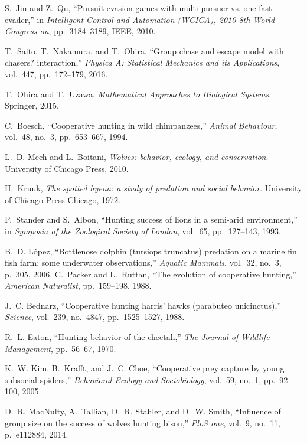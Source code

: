 \documentclass[12pt,a4paper,final]{iopart}
\begin{document}
\begin{thebibliography}{10}
S.~Jin and Z.~Qu, ``Pursuit-evasion games with multi-pursuer vs. one fast
evader,'' in {\em Intelligent Control and Automation (WCICA), 2010 8th World
Congress on}, pp.~3184--3189, IEEE, 2010.

T.~Saito, T.~Nakamura, and T.~Ohira, ``Group chase and escape model with
chasers? interaction,'' {\em Physica A: Statistical Mechanics and its
Applications}, vol.~447, pp.~172--179, 2016.

T.~Ohira and T.~Uzawa, {\em Mathematical Approaches to Biological Systems}.
\newblock Springer, 2015.


C.~Boesch, ``Cooperative hunting in wild chimpanzees,'' {\em Animal Behaviour},
vol.~48, no.~3, pp.~653--667, 1994.

L.~D. Mech and L.~Boitani, {\em Wolves: behavior, ecology, and conservation}.
\newblock University of Chicago Press, 2010.

H.~Kruuk, {\em The spotted hyena: a study of predation and social behavior}.
\newblock University of Chicago Press Chicago, 1972.

P.~Stander and S.~Albon, ``Hunting success of lions in a semi-arid
environment,'' in {\em Symposia of the Zoological Society of London},
vol.~65, pp.~127--143, 1993.

B.~D. L{\'o}pez, ``Bottlenose dolphin (tursiops truncatus) predation on a
marine fin fish farm: some underwater observations,'' {\em Aquatic Mammals},
vol.~32, no.~3, p.~305, 2006.
C.~Packer and L.~Ruttan, ``The evolution of cooperative hunting,'' {\em
American Naturalist}, pp.~159--198, 1988.

J.~C. Bednarz, ``Cooperative hunting harris' hawks (parabuteo unicinctus),''
{\em Science}, vol.~239, no.~4847, pp.~1525--1527, 1988.

R.~L. Eaton, ``Hunting behavior of the cheetah,'' {\em The Journal of Wildlife
Management}, pp.~56--67, 1970.

K.~W. Kim, B.~Krafft, and J.~C. Choe, ``Cooperative prey capture by young
subsocial spiders,'' {\em Behavioral Ecology and Sociobiology}, vol.~59,
no.~1, pp.~92--100, 2005.

D.~R. MacNulty, A.~Tallian, D.~R. Stahler, and D.~W. Smith, ``Influence of
group size on the success of wolves hunting bison,'' {\em PloS one}, vol.~9,
no.~11, p.~e112884, 2014.


\end{thebibliography}
\end{document}
